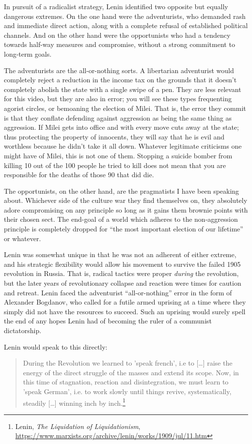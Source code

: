 \documentclass[11pt]{article}
\begin{document}
In pursuit of a radicalist strategy, Lenin identified two opposite but equally dangerous extremes. On the one hand were the adventurists, who demanded rash and immediate direct action, along with a complete refusal of established political channels. And on the other hand were the opportunists who had a tendency towards half-way measures and compromise, without a strong commitment to long-term goals.

The adventurists are the all-or-nothing sorts. A libertarian adventurist would completely reject a reduction in the income tax on the grounds that it doesn't completely abolish the state with a single swipe of a pen. They are less relevant for this video, but they are also in error; you will see these types frequenting agorist circles, or bemoaning the election of Milei. That is, the error they commit is that they conflate defending against aggression as being the same thing as aggression. If Milei gets into office and with every move cuts away at the state; thus protecting the property of innocents, they will say that he is evil and worthless because he didn't take it all down. Whatever legitimate criticisms one might have of Milei, this is not one of them. Stopping a suicide bomber from killing 10 out of the 100 people he tried to kill does not mean that you are responsible for the deaths of those 90 that did die.

The opportunists, on the other hand, are the pragmatists I have been speaking about. Whichever side of the culture war they find themselves on, they absolutely adore compromising on any principle so long as it gains them brownie points with their chosen sect. The end-goal of a world which adheres to the non-aggression principle is completely dropped for ``the most important election of our lifetime'' or whatever.

Lenin was somewhat unique in that he was not an adherent of either extreme, and his strategic flexibility would allow his movement to survive the failed 1905 revolution in Russia. That is, radical tactics were proper \emph{during} the revolution, but the later years of revolutionary collapse and reaction were times for caution and retreat. Lenin faced the adventurist ``all-or-nothing'' error in the form of Alexander Bogdanov, who called for a futile armed uprising at a time where they simply did not have the resources to succeed. Such an uprising would surely spell the end of any hopes Lenin had of becoming the ruler of a communist dictatorship.

Lenin would speak to this directly:
\begin{quote}
During the Revolution we learned to 'speak french', i.e to [\ldots{}] raise the energy of the direct struggle of the masses and extend its scope. Now, in this time of stagnation, reaction and disintegration, we must learn to 'speak German', i.e. to work slowly until things revive, systematically, steadily [\ldots{}] winning inch by inch.\footnote{Lenin, \emph{The Liquidation of Liquidationism}, \url{https://www.marxists.org/archive/lenin/works/1909/jul/11.htm}}
\end{quote}
\end{document}

